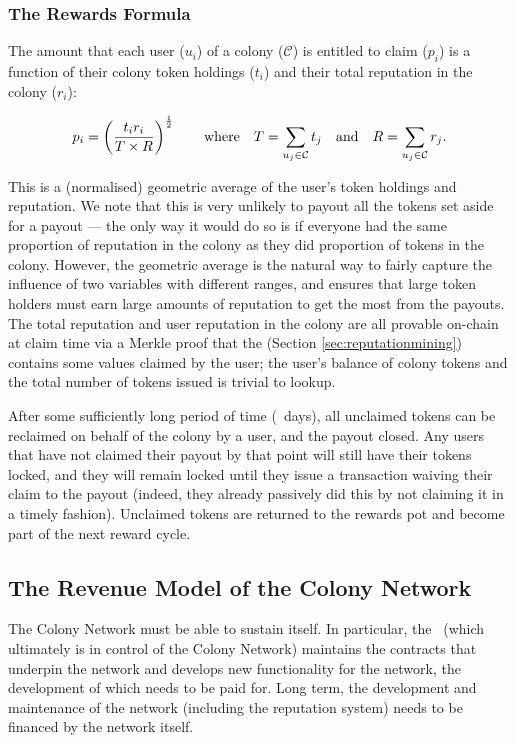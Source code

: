 \subsubsection*{The Rewards Formula}
The amount that each user ($u_i$) of a colony ($\mathcal{C}$) is entitled to claim ($p_i$) is a function of their colony token holdings ($t_i$) and their total reputation in the colony ($r_i$):

\begin{equation}\label{eq:reward-claim}
 p_i = \left(\frac{t_i r_i}{T \times R}\right)^{\frac{1}{2}} \qquad \textnormal{where} \quad T = \sum\limits_{u_j\in \mathcal{C}} t_j \quad\textnormal{and}\quad R = \sum\limits_{u_j\in \mathcal{C}} r_j.
\end{equation}

This is a (normalised) geometric average of the user's token holdings and reputation. We note that this is very unlikely to payout all the tokens set aside for a payout --- the only way it would do so is if everyone had the same proportion of reputation in the colony as they did proportion of tokens in the colony. However, the geometric average is the natural way to fairly capture the influence of two variables with different ranges, and ensures that large token holders must earn large amounts of reputation to get the most from the payouts. The total reputation and user reputation in the colony are all provable on-chain at claim time via a Merkle proof that the  (Section \ref{sec:reputationmining}) contains some values claimed by the user; the user's balance of colony tokens and the total number of tokens issued is trivial to lookup.

After some sufficiently long period of time (\rewardclaimduration\ days), all unclaimed tokens can be reclaimed on behalf of the colony by a user, and the payout closed. Any users that have not claimed their payout by that point will still have their tokens locked, and they will remain locked until they issue a transaction waiving their claim to the payout (indeed, they already passively did this by not claiming it in a timely fashion). Unclaimed tokens are returned to the rewards pot and become part of the next reward cycle.

\subsection{The Revenue Model of the Colony Network}\label{sec:networkrevenue}
The Colony Network must be able to sustain itself. In particular, the \rc\ (which ultimately is in control of the Colony Network) maintains the contracts that underpin the network and develops new functionality for the network, the development of which needs to be paid for. Long term, the development and maintenance of the network (including the reputation system) needs to be financed by the network itself.

